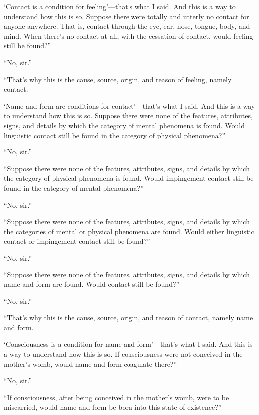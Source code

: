 \documentclass[12pt,openany]{book}%
\begin{document}
‘Contact is a condition for feeling’—that’s what I said. And this is a way to understand how this is so. Suppose there were totally and utterly no contact for anyone anywhere. That is, contact through the eye, ear, nose, tongue, body, and mind. When there’s no contact at all, with the cessation of contact, would feeling still be found?” 

“No, sir.” 

“That’s why this is the cause, source, origin, and reason of feeling, namely contact. 

‘Name and form are conditions for contact’—that’s what I said. And this is a way to understand how this is so. Suppose there were none of the features, attributes, signs, and details by which the category of mental phenomena is found. Would linguistic contact still be found in the category of physical phenomena?” 

“No, sir.” 

“Suppose there were none of the features, attributes, signs, and details by which the category of physical phenomena is found. Would impingement contact still be found in the category of mental phenomena?” 

“No, sir.” 

“Suppose there were none of the features, attributes, signs, and details by which the categories of mental or physical phenomena are found. Would either linguistic contact or impingement contact still be found?” 

“No, sir.” 

“Suppose there were none of the features, attributes, signs, and details by which name and form are found. Would contact still be found?” 

“No, sir.” 

“That’s why this is the cause, source, origin, and reason of contact, namely name and form. 

‘Consciousness is a condition for name and form’—that’s what I said. And this is a way to understand how this is so. If consciousness were not conceived in the mother’s womb, would name and form coagulate there?” 

“No, sir.” 

“If consciousness, after being conceived in the mother’s womb, were to be miscarried, would name and form be born into this state of existence?” 
\end{document}
